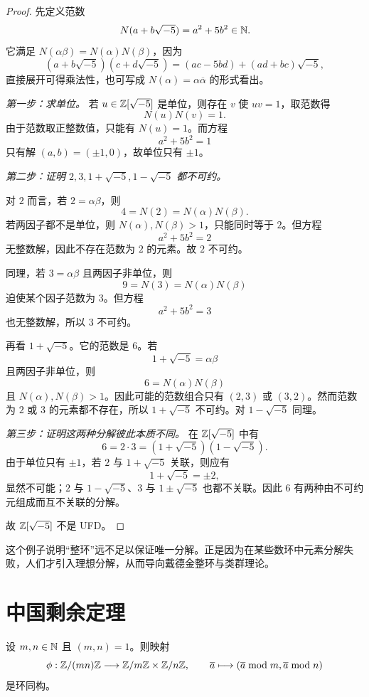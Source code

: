 \begin{proof}
先定义范数
\[
N(a+b\sqrt{-5})=a^2+5b^2\in \mathbb{N}.
\]
它满足 $N(\alpha\beta)=N(\alpha)N(\beta)$，因为
\[
(a+b\sqrt{-5})(c+d\sqrt{-5})=(ac-5bd)+(ad+bc)\sqrt{-5},
\]
直接展开可得乘法性，也可写成 $N(\alpha)=\alpha\overline{\alpha}$ 的形式看出。

\emph{第一步：求单位。} 若 $u\in\mathbb{Z}[\sqrt{-5}]$ 是单位，则存在 $v$ 使 $uv=1$，取范数得
\[
N(u)N(v)=1.
\]
由于范数取正整数值，只能有 $N(u)=1$。而方程
\[
a^2+5b^2=1
\]
只有解 $(a,b)=(\pm1,0)$，故单位只有 $\pm1$。

\emph{第二步：证明 $2,3,1+\sqrt{-5},1-\sqrt{-5}$ 都不可约。}

对 $2$ 而言，若 $2=\alpha\beta$，则
\[
4=N(2)=N(\alpha)N(\beta).
\]
若两因子都不是单位，则 $N(\alpha),N(\beta)>1$，只能同时等于 $2$。但方程
\[
a^2+5b^2=2
\]
无整数解，因此不存在范数为 $2$ 的元素。故 $2$ 不可约。

同理，若 $3=\alpha\beta$ 且两因子非单位，则
\[
9=N(3)=N(\alpha)N(\beta)
\]
迫使某个因子范数为 $3$。但方程
\[
a^2+5b^2=3
\]
也无整数解，所以 $3$ 不可约。

再看 $1+\sqrt{-5}$。它的范数是 $6$。若
\[
1+\sqrt{-5}=\alpha\beta
\]
且两因子非单位，则
\[
6=N(\alpha)N(\beta)
\]
且 $N(\alpha),N(\beta)>1$。因此可能的范数组合只有 $(2,3)$ 或 $(3,2)$。然而范数为 $2$ 或 $3$ 的元素都不存在，所以 $1+\sqrt{-5}$ 不可约。对 $1-\sqrt{-5}$ 同理。

\emph{第三步：证明这两种分解彼此本质不同。} 在 $\mathbb{Z}[\sqrt{-5}]$ 中有
\[
6=2\cdot 3=(1+\sqrt{-5})(1-\sqrt{-5}).
\]
由于单位只有 $\pm1$，若 $2$ 与 $1+\sqrt{-5}$ 关联，则应有
\[
1+\sqrt{-5}=\pm 2,
\]
显然不可能；$2$ 与 $1-\sqrt{-5}$、$3$ 与 $1\pm\sqrt{-5}$ 也都不关联。因此 $6$ 有两种由不可约元组成而互不关联的分解。

故 $\mathbb{Z}[\sqrt{-5}]$ 不是 UFD。
\end{proof}

\begin{remark}
这个例子说明“整环”远不足以保证唯一分解。正是因为在某些数环中元素分解失败，人们才引入理想分解，从而导向戴德金整环与类群理论。
\end{remark}

\section{中国剩余定理}

\begin{theorem}[整数情形的中国剩余定理]
设 $m,n\in\mathbb{N}$ 且 $(m,n)=1$。则映射
\[
\phi:\mathbb{Z}/(mn)\mathbb{Z}\longrightarrow \mathbb{Z}/m\mathbb{Z}\times \mathbb{Z}/n\mathbb{Z},
\qquad
\overline{a}\longmapsto (\overline{a}\bmod m,\overline{a}\bmod n)
\]
是环同构。
\end{theorem}

